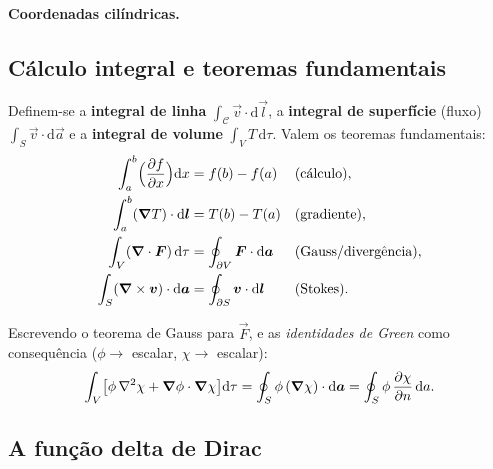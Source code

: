 \paragraph{Coordenadas cilíndricas.}

\subsection{Cálculo integral e teoremas fundamentais}

Definem-se a \textbf{integral de linha} $\int_{\mathcal{C}}\vec{v}\cdot\mathrm{d}\vec{l}$,
a \textbf{integral de superfície} (fluxo) $\int_{S}\vec{v}\cdot\mathrm{d}\vec{a}$
e a \textbf{integral de volume} $\int_{V}T\,\mathrm{d}\tau$. Valem os teoremas
fundamentais:
\begin{align}
  \int_{a}^{b}\!\Big(\dfrac{\partial f}{\partial x}\Big)\mathrm{d}x&=f(b)-f(a)
     &&\text{(cálculo)},\\
  \int_{a}^{b}(\bm{\nabla} T)\cdot\mathrm{d}\bm{l}&=T(b)-T(a)
     &&\text{(gradiente)},\\
  \int_{V}(\bm{\nabla}\cdot\bm{F})\,\mathrm{d}\tau&=\oint_{\partial V}\bm{F}\cdot\mathrm{d}\bm{a}
     &&\text{(Gauss/divergência)},\\
  \int_{S}(\bm{\nabla}\times\bm{v})\cdot\mathrm{d}\bm{a}&=\oint_{\partial S}\bm{v}\cdot\mathrm{d}\bm{l}
     &&\text{(Stokes)}.
\end{align}
\begin{nota}
Escrevendo o teorema de Gauss para $\vec{F}$, e as \emph{identidades de Green}
como consequência ($\phi\to$ escalar, $\chi\to$ escalar):
\begin{equation}
  \int_V\!\big[\phi\,\nabla^2\chi+\bm{\nabla}\phi\cdot\bm{\nabla}\chi\big]\mathrm{d}\tau
    =\oint_{S}\phi\,(\bm{\nabla}\chi)\cdot\mathrm{d}\bm{a}
    =\oint_S \phi\,\dfrac{\partial \chi}{\partial n}\,\mathrm{d}a .
\end{equation}
\end{nota}

\subsection{A função delta de Dirac}

